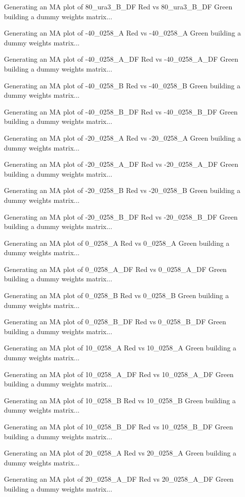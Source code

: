 \documentclass[titlepage]{article}
\begin{document}
\begin{Schunk}
\begin{Soutput}
Generating an MA plot of  80_ura3_B_DF Red vs 80_ura3_B_DF Green 
building a dummy weights matrix... 

Generating an MA plot of  -40_0258_A Red vs -40_0258_A Green 
building a dummy weights matrix... 

Generating an MA plot of  -40_0258_A_DF Red vs -40_0258_A_DF Green 
building a dummy weights matrix... 

Generating an MA plot of  -40_0258_B Red vs -40_0258_B Green 
building a dummy weights matrix... 

Generating an MA plot of  -40_0258_B_DF Red vs -40_0258_B_DF Green 
building a dummy weights matrix... 

Generating an MA plot of  -20_0258_A Red vs -20_0258_A Green 
building a dummy weights matrix... 

Generating an MA plot of  -20_0258_A_DF Red vs -20_0258_A_DF Green 
building a dummy weights matrix... 

Generating an MA plot of  -20_0258_B Red vs -20_0258_B Green 
building a dummy weights matrix... 

Generating an MA plot of  -20_0258_B_DF Red vs -20_0258_B_DF Green 
building a dummy weights matrix... 

Generating an MA plot of  0_0258_A Red vs 0_0258_A Green 
building a dummy weights matrix... 

Generating an MA plot of  0_0258_A_DF Red vs 0_0258_A_DF Green 
building a dummy weights matrix... 

Generating an MA plot of  0_0258_B Red vs 0_0258_B Green 
building a dummy weights matrix... 

Generating an MA plot of  0_0258_B_DF Red vs 0_0258_B_DF Green 
building a dummy weights matrix... 

Generating an MA plot of  10_0258_A Red vs 10_0258_A Green 
building a dummy weights matrix... 

Generating an MA plot of  10_0258_A_DF Red vs 10_0258_A_DF Green 
building a dummy weights matrix... 

Generating an MA plot of  10_0258_B Red vs 10_0258_B Green 
building a dummy weights matrix... 

Generating an MA plot of  10_0258_B_DF Red vs 10_0258_B_DF Green 
building a dummy weights matrix... 

Generating an MA plot of  20_0258_A Red vs 20_0258_A Green 
building a dummy weights matrix... 

Generating an MA plot of  20_0258_A_DF Red vs 20_0258_A_DF Green 
building a dummy weights matrix... 


\end{Soutput}
\end{Schunk}
\end{document}
